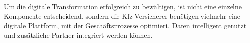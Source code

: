 
Um die digitale Transformation erfolgreich zu bewältigen, ist nicht eine einzelne Komponente entscheidend, sondern die Kfz-Versicherer benötigen vielmehr eine digitale Plattform, mit der Geschäftsprozesse optimiert, Daten intelligent genutzt und zusätzliche Partner integriert werden können. \autocite[Vgl.][]{WEINGARTNER2023}




